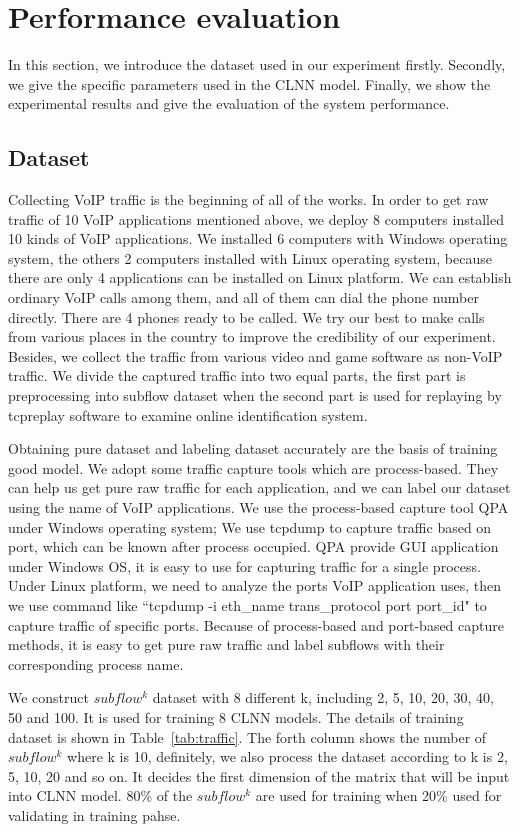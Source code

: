 \documentclass[conference]{IEEEtran}
\begin{document}
\section{Performance evaluation}
\label{sec:performanceevaluation}
In this section, we introduce the dataset used in our experiment firstly. Secondly, we give the specific parameters used in the CLNN model. Finally, we show the experimental results and give the evaluation of the system performance.
\subsection{Dataset}
\label{sec:dataset}
Collecting VoIP traffic is the beginning of all of the works. In order to get raw traffic of 10 VoIP applications mentioned above, we deploy 8 computers installed 10 kinds of VoIP applications. We installed 6 computers with Windows operating system, the others 2 computers installed with Linux operating system, because there are only 4 applications can be installed on Linux platform. We can establish ordinary VoIP calls among them, and all of them can dial the phone number directly. There are 4 phones ready to be called. We try our best to make calls from various places in the country to improve the credibility of our experiment. Besides, we collect the traffic from various video and game software as non-VoIP traffic. We divide the captured traffic into two equal parts, the first part is preprocessing into subflow dataset when the second part is used for replaying by tcpreplay software to examine online identification system.

Obtaining pure dataset and labeling dataset accurately are the basis of training good model. We adopt some traffic capture tools which are process-based. They can help us get pure raw traffic for each application, and we can label our dataset using the name of VoIP applications. We use the process-based capture tool QPA under Windows operating system; We use tcpdump to capture traffic based on port, which can be known after process occupied. QPA provide GUI application under Windows OS, it is easy to use for capturing traffic for a single process. Under Linux platform, we need to analyze the ports VoIP application uses, then we use command like ``tcpdump -i eth\_name trans\_protocol port port\_id" to capture traffic of specific ports. Because of process-based and port-based capture methods, it is easy to get pure raw traffic and label subflows with their corresponding process name.


We construct $subflow^k$ dataset with 8 different k, including 2, 5, 10, 20, 30, 40, 50 and 100. It is used for training 8 CLNN models. The details of training dataset is shown in Table~\ref{tab:traffic}. The forth column shows the number of $subflow^k$ where k is 10, definitely, we also process the dataset according to k is 2, 5, 10, 20 and so on. It decides the first dimension of the matrix that will be input into CLNN model. 80\% of the $subflow^k$ are used for training when 20\% used for validating in training pahse.
\end{document}
